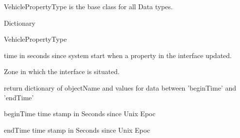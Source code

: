 Vehicle\+Property\+Type is the base class for all Data types. 

Dictionary

Vehicle\+Property\+Type

time in seconds since system start when a property in the interface updated.

Zone in which the interface is situated.

return dictionary of object\+Name and values for data between 'begin\+Time' and 'end\+Time' \begin{DoxyItemize}
\item begin\+Time time stamp in Seconds since Unix Epoc \item end\+Time time stamp in Seconds since Unix Epoc \end{DoxyItemize}
